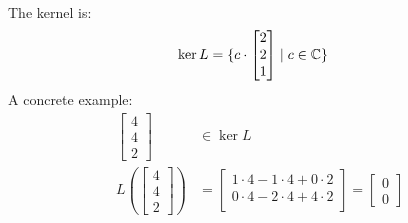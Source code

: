 \begin{example}
\begin{align*}
    \end{align*}
    The kernel is:
    \begin{align*}
        \ker L & = \{
            c \cdot \begin{bmatrix}
                2 \\ 2 \\ 1
            \end{bmatrix}
         \mid c \in \mathbb{C}  \}
    \end{align*}
    A concrete example:
    \begin{align*}
        \begin{bmatrix}
            4 \\ 4 \\ 2
        \end{bmatrix}                 & \in \ker L                                                \\
        L \left(\begin{bmatrix}
            4 \\ 4 \\ 2
        \end{bmatrix} \right) & = \begin{bmatrix}
            1 \cdot 4  -1 \cdot 4  + 0 \cdot 2 \\
            0 \cdot 4  -2 \cdot 4 + 4 \cdot 2  \\
        \end{bmatrix} = \begin{bmatrix}
            0 \\ 0
        \end{bmatrix} \\
    \end{align*}
\begin{example}
    
\end{example}

\end{example}
